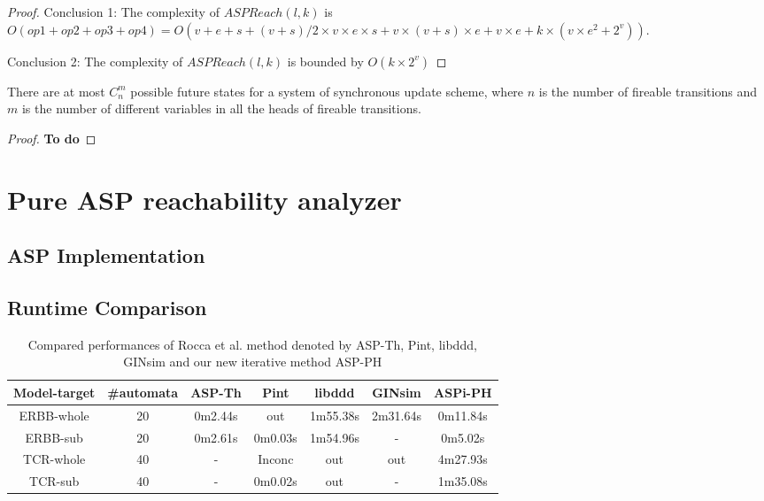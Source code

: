\begin{theorem}
\begin{proof}
        Conclusion 1: The complexity of $ASPReach(l,k)$ is $O(op1 + op2 + op3 + op4) = O(v + e + s + (v+s) / 2  \times v \times e \times s + v \times (v+s) \times e + v \times e + k \times (v \times e^{2} + 2^{v}))$.
        
        Conclusion 2: The complexity of $ASPReach(l,k)$ is bounded by $O(k \times 2^{v})$
    \end{proof}
\end{theorem}

\begin{theorem}
    There are at most $C_n^m$ possible future states for a system of synchronous update scheme, where $n$ is the number of fireable transitions and $m$ is the number of different variables in all the heads of fireable transitions. 
    \begin{proof}
        \textbf{To do}
    \end{proof}
\end{theorem}



\chapter{Pure ASP reachability analyzer}
\section{ASP Implementation}
\section{Runtime Comparison}
\cite{abdallah2015exhaustive}
\begin{table}[ht]
    \centering
    \footnotesize
    \begin{tabular}{c|c|c|c|c|c|c}
        Model-target & \#automata & ASP-Th & Pint & libddd & GINsim & ASPi-PH\\
        \hline
        ERBB-whole & 20& 0m2.44s& out& 1m55.38s& 2m31.64s& 0m11.84s\\
        \hline
        ERBB-sub& 20& 0m2.61s& 0m0.03s& 1m54.96s& -& 0m5.02s\\
        \hline
        TCR-whole& 40& - &Inconc& out& out& 4m27.93s\\
        \hline
        TCR-sub& 40 &- &0m0.02s& out& -& 1m35.08s
    \end{tabular}
    \caption[Performance of pure ASP method]{Compared performances of Rocca et al. method \cite{rocca2014asp} denoted by ASP-Th, Pint, libddd, GINsim and our new iterative method ASP-PH}
    \label{tab:pureAsp}
\end{table}